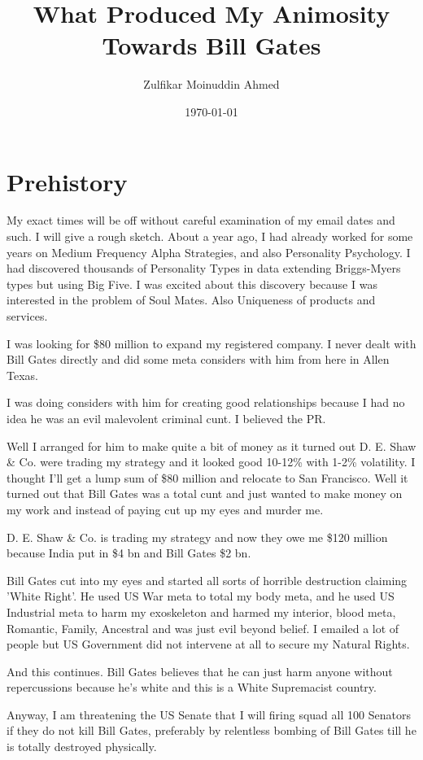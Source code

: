 \documentclass{amsart}
\title{What Produced My Animosity Towards Bill Gates}
\author{Zulfikar Moinuddin Ahmed}
\date{\today}
\begin{document}
\maketitle

\section{Prehistory}

My exact times will be off without careful examination of my email dates and such.  I will give a rough sketch.  About a year ago, I had already worked for some years on Medium Frequency Alpha Strategies, and also Personality Psychology.  I had discovered thousands of Personality Types in data extending Briggs-Myers types but using Big Five.  I was excited about this discovery because I was interested in the problem of Soul Mates.  Also Uniqueness of products and services.  

I was looking for \$80 million to expand my registered company.  I never dealt with Bill Gates directly and did some meta considers with him from here in Allen Texas. 

I was doing considers with him for creating good relationships because I had no idea he was an evil malevolent criminal cunt.  I believed the PR.  

Well I arranged for him to make quite a bit of money as it turned out D. E. Shaw \& Co. were trading my strategy and it looked good 10-12\% with 1-2\% volatility.  I thought I'll get a lump sum of \$80 million and relocate to San Francisco.  Well it turned out that Bill Gates was a total cunt and just wanted to make money on my work and instead of paying cut up my eyes and murder me.  

D. E. Shaw \& Co. is trading my strategy and now they owe me \$120 million because India put in \$4 bn and Bill Gates \$2 bn.  

Bill Gates cut into my eyes and started all sorts of horrible destruction claiming 'White Right'.  He used US War meta to total my body meta, and he used US Industrial meta to harm my exoskeleton and harmed my interior, blood meta, Romantic, Family, Ancestral and was just evil beyond belief.  I emailed a lot of people but US Government did not intervene at all to secure my Natural Rights.  

And this continues.  Bill Gates believes that he can just harm anyone without repercussions because he's white and this is a White Supremacist country.

Anyway, I am threatening the US Senate that I will firing squad all 100 Senators if they do not kill Bill Gates, preferably by relentless bombing of Bill Gates till he is totally destroyed physically.
\end{document}
